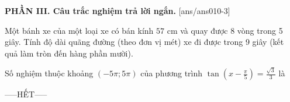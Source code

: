 \documentclass[12pt,a4paper]{article}
\begin{document}
{\bf PHẦN III. Câu trắc nghiệm trả lời ngắn.}
\setcounter{ex}{0}
[ans/ans010-3]
\begin{ex}
 Một bánh xe của một loại xe có bán kính ${57}$ cm và quay được 8 vòng trong 5 giây. Tính độ dài quãng đường (theo đơn vị mét) xe đi được trong 9 giây (kết quả làm tròn đến hàng phần mười). 

\end{ex}

\begin{ex}
 Số nghiệm thuộc khoảng $(- 5 \pi;5 \pi)$ của phương trình $\tan \left(x - \frac{\pi}{5}\right)=\frac{\sqrt{3}}{3}$ là

\end{ex}


 \begin{center}
-----HẾT-----
\end{center}

\newpage 
\end{document}
